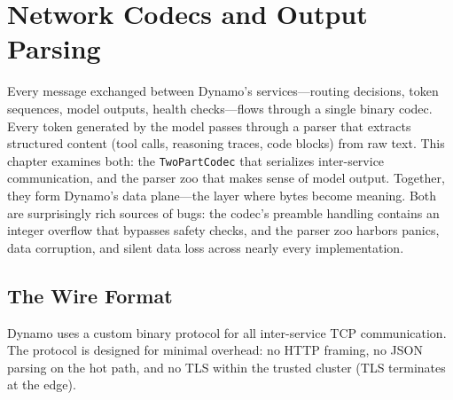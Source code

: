 \chapter{Network Codecs and Output Parsing}
\label{ch:codecs}

Every message exchanged between Dynamo's services---routing decisions, token sequences, model outputs, health checks---flows through a single binary codec. Every token generated by the model passes through a parser that extracts structured content (tool calls, reasoning traces, code blocks) from raw text. This chapter examines both: the \texttt{TwoPartCodec} that serializes inter-service communication, and the parser zoo that makes sense of model output. Together, they form Dynamo's data plane---the layer where bytes become meaning. Both are surprisingly rich sources of bugs: the codec's preamble handling contains an integer overflow that bypasses safety checks, and the parser zoo harbors panics, data corruption, and silent data loss across nearly every implementation.

\section{The Wire Format}
\label{sec:codecs:wire}

%
Dynamo uses a custom binary protocol for all inter-service TCP communication. The protocol is designed for minimal overhead: no HTTP framing, no JSON parsing on the hot path, and no TLS within the trusted cluster (TLS terminates at the edge).

